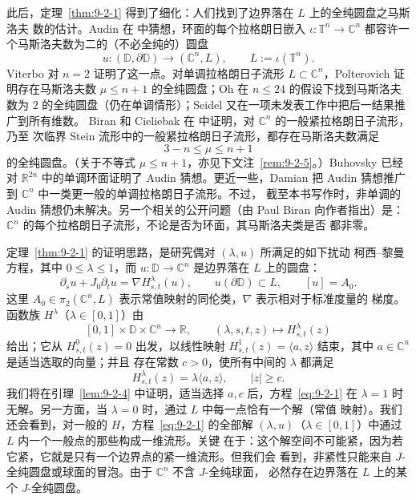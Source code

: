 \begin{remark}\label{rem:9-2-2}
此后，定理~\ref{thm:9-2-1} 得到了细化：人们找到了边界落在 $L$ 上的全纯圆盘之马斯洛夫
数的估计。Audin 在  中猜想，环面的每个拉格朗日嵌入
$\iota:\mathbb T^n\to\mathbb C^n$ 都容许一个马斯洛夫数为二的（不必全纯的）圆盘
\[
  u:(\mathbb D,\partial\mathbb D)\longrightarrow(\mathbb C^n,L),
  \qquad L:=\iota(\mathbb T^n).
\]
Viterbo  对 $n=2$ 证明了这一点。对单调拉格朗日子流形
$L\subset\mathbb C^n$，Polterovich  证明存在马斯洛夫数
$\mu\le n+1$ 的全纯圆盘；Oh  在 $n\le24$ 的假设下找到马斯洛夫数为 $2$
的全纯圆盘（仍在单调情形）；Seidel 又在一项未发表工作中把后一结果推广到所有维数。
Biran 和 Cieliebak 在  中证明，对 $\mathbb C^n$ 的一般紧拉格朗日子流形，乃至
次临界 Stein 流形中的一般紧拉格朗日子流形，都存在马斯洛夫数满足
\[
  3-n\le\mu\le n+1
\]
的全纯圆盘。（关于不等式 $\mu\le n+1$，亦见下文注~\ref{rem:9-2-5}。）Buhovsky
 已经对 $\mathbb R^{2n}$ 中的单调环面证明了 Audin 猜想。更近一些，Damian
 把 Audin 猜想推广到 $\mathbb C^n$ 中一类更一般的单调拉格朗日子流形。不过，
截至本书写作时，非单调的 Audin 猜想仍未解决。另一个相关的公开问题（由 Paul Biran
向作者指出）是：$\mathbb C^n$ 的每个拉格朗日子流形，不论是否为环面，其马斯洛夫类是否
都非零。
\end{remark}


定理~\ref{thm:9-2-1} 的证明思路，是研究偶对 $(\lambda,u)$ 所满足的如下扰动
柯西--黎曼方程，其中 $0\le\lambda\le1$，而
$u:\mathbb D\to\mathbb C^n$ 是边界落在 $L$ 上的圆盘：
\begin{equation}\label{eq:9-2-1}
  \partial_su+J_0\partial_tu
  =\nabla H^\lambda_{s,t}(u),
  \qquad u(\partial\mathbb D)\subset L,
  \qquad [u]=A_0.
\end{equation}
这里 $A_0\in\pi_2(\mathbb C^n,L)$ 表示常值映射的同伦类，$\nabla$ 表示相对于标准度量的
梯度。函数族 $H^\lambda$（$\lambda\in[0,1]$）由
\[
  [0,1]\times\mathbb D\times\mathbb C^n\longrightarrow\mathbb R,
  \qquad(\lambda,s,t,z)\longmapsto H^\lambda_{s,t}(z)
\]
给出；它从 $H^0_{s,t}(z)=0$ 出发，以线性映射
$H^1_{s,t}(z)=\langle a,z\rangle$ 结束，其中 $a\in\mathbb C^n$ 是适当选取的向量；并且
存在常数 $c>0$，使所有中间的 $\lambda$ 都满足
\begin{equation}\label{eq:9-2-2}
  H^\lambda_{s,t}(z)=\lambda\langle a,z\rangle,
  \qquad |z|\ge c.
\end{equation}
我们将在引理~\ref{lem:9-2-4} 中证明，适当选择 $a,c$ 后，方程~\eqref{eq:9-2-1} 在
$\lambda=1$ 时无解。另一方面，当 $\lambda=0$ 时，通过 $L$ 中每一点恰有一个解（常值
映射）。我们还会看到，对一般的 $H$，方程~\eqref{eq:9-2-1} 的全部解
$(\lambda,u)$（$\lambda\in[0,1]$）中通过 $L$ 内一个一般点的那些构成一维流形。关键
在于：这个解空间不可能紧，因为若它紧，它就是只有一个边界点的紧一维流形。但我们会
看到，非紧性只能来自 $J$-全纯圆盘或球面的冒泡。由于 $\mathbb C^n$ 不含 $J$-全纯球面，
必然存在边界落在 $L$ 上的某个 $J$-全纯圆盘。

